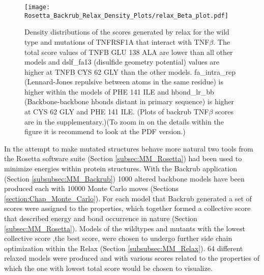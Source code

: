 	\newpage
		
	\begin{figure}[!ht]
		\centering
		\texttt{[image: Rosetta\_Backrub\_Relax\_Density\_Plots/relax\_Beta\_plot.pdf]}
		\caption[TNFRSF1A homotrimer with TNF$\beta$ homotrimer relax density plots]{Density distributions of the scores generated by relax for the wild type and mutations of TNFRSF1A that interact with TNF$\beta$. The total score values of TNFB GLU 138 ALA are lower than all other models and dslf\_fa13 (disulfide geometry potential) values are higher at TNFB CYS 62 GLY than the other models. fa\_intra\_rep (Lennard-Jones repulsive between atoms in the same residue) is higher within the models of PHE 141 ILE and hbond\_lr\_bb (Backbone-backbone hbonds distant in primary sequence) is higher at CYS 62 GLY and PHE 141 ILE.
		(Plots of backrub TNF$\beta$ scores are in the supplementary.)(To zoom in on the details within the figure it is recommend to look at the PDF version.)}
		\label{fig:relax_TNFB_scores}
	\end{figure}

	\newpage
	
	In the attempt to make mutated structures behave more natural two tools from the Rosetta software suite (Section \ref{subsec:MM_Rosetta}) had been used to minimize energies within protein structures. With the Backrub application (Section \ref{subsubsec:MM_Backrub}) 1000 altered backbone models have been produced each with 10000 Monte Carlo moves (Sections \ref{section:Chap_Monte_Carlo}). For each model that Backrub generated a set of scores were assigned to the properties, which together formed a collective score that described energy and bond occurrence in nature (Section \ref{subsec:MM_Rosetta}). Models of the wildtypes and mutants with the lowest collective score ,the best score, were chosen to undergo further side chain optimization within the Relax (Section \ref{subsubsec:MM_Relax}). 64 different relaxed models were produced and with various scores related to the properties of which the one with lowest total score would be chosen to visualize. 
	
